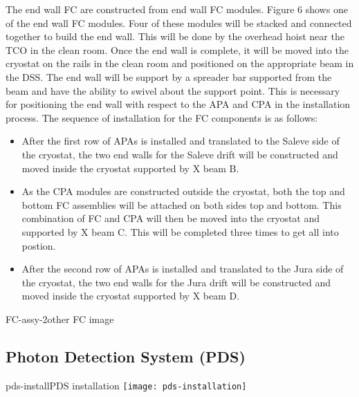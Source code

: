 The end wall FC are constructed from end wall FC modules.  Figure 6 shows one of the end wall FC modules.  Four of these modules will be stacked and connected together to build the end wall.  This will be done by the overhead hoist near the TCO in the clean room.  Once the end wall is complete, it will be moved into the cryostat on the rails in the clean room and positioned on the appropriate beam in the DSS.  The end wall will be support by a spreader bar supported from the beam and have the ability to swivel about the support point.  This is necessary for positioning the end wall with respect to the APA and CPA in the installation process.  
The sequence of installation for the FC components is as follows:
\begin{itemize}
\item After the first row of APAs is installed and translated to the Saleve side of the cryostat, the two end walls for the Saleve drift will be constructed and moved inside the cryostat supported by X beam B.  
\item As the CPA modules are constructed outside the cryostat, both the top and bottom FC assemblies will be attached on both sides top and bottom.  This combination of FC and CPA will then be moved into the cryostat and supported by X beam C.  This will be completed three times to get all into postion.
\item After the second row of APAs is installed and translated to the Jura side of the cryostat, the two end walls for the Jura drift will be constructed and moved inside the cryostat supported by X beam D.  
\end{itemize}

\begin{cdrfigure}{FC-assy-2}{other FC image}
\end{cdrfigure}


\subsection{Photon Detection System (PDS)}


\begin{cdrfigure}{pds-install}{PDS installation}
\texttt{[image: pds-installation]}
\end{cdrfigure}



